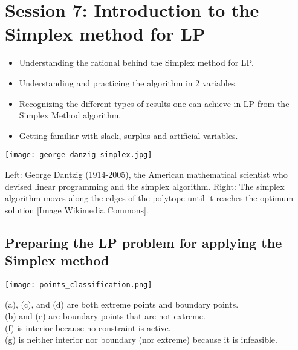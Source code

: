 \section{Session 7: Introduction to the Simplex method for LP}


\begin{itemize}
  \item Understanding the rational behind the Simplex method for LP.
  \item Understanding and practicing the algorithm in 2 variables.
  \item Recognizing the different types of results one can achieve in LP from the Simplex Method algorithm.
  \item Getting familiar with slack, surplus and artificial variables.
\end{itemize}



  \begin{center}
    \texttt{[image: george-danzig-simplex.jpg]}
  \end{center}

  Left: George Dantzig (1914-2005), the American mathematical scientist who devised linear programming and the simplex algorithm. Right: The simplex algorithm moves along the edges of the polytope until it reaches the optimum solution [Image Wikimedia Commons].

\subsection{Preparing the LP problem for applying the Simplex method}

 
      \begin{center}
        \texttt{[image: points\_classification.png]}
      \end{center}
   
      (a), (c), and (d) are both extreme points and boundary points. \\
      (b) and (e) are boundary points that are not extreme. \\
      (f) is interior because no constraint is active. \\
      (g) is neither interior nor boundary (nor extreme) because it is infeasible.\cite{rardin_optimization_2017}


